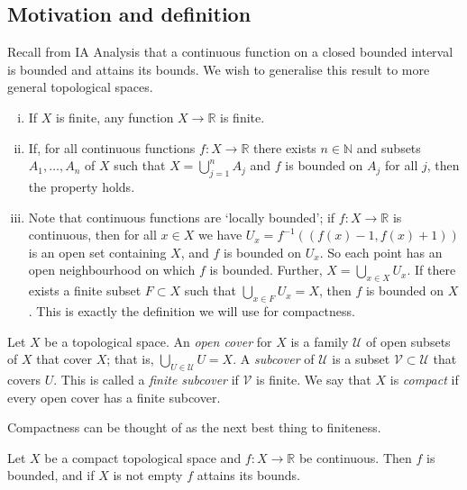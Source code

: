 \subsection{Motivation and definition}
Recall from IA Analysis that a continuous function on a closed bounded interval is bounded and attains its bounds.
We wish to generalise this result to more general topological spaces.
\begin{example}
	\begin{enumerate}[(i)]
		\item If \( X \) is finite, any function \( X \to \mathbb R \) is finite.
		\item If, for all continuous functions \( f \colon X \to \mathbb R \) there exists \( n \in \mathbb N \) and subsets \( A_1, \dots, A_n \) of \( X \) such that \( X = \bigcup_{j=1}^n A_j \) and \( f \) is bounded on \( A_j \) for all \( j \), then the property holds.
		\item Note that continuous functions are `locally bounded'; if \( f \colon X \to \mathbb R \) is continuous, then for all \( x \in X \) we have \( U_x = f^{-1}((f(x)-1, f(x)+1)) \) is an open set containing \( X \), and \( f \) is bounded on \( U_x \).
		      So each point has an open neighbourhood on which \( f \) is bounded.
		      Further, \( X = \bigcup_{x \in X} U_x \).
		      If there exists a finite subset \( F \subset X \) such that \( \bigcup_{x \in F} U_x = X \), then \( f \) is bounded on \( X \).
		      This is exactly the definition we will use for compactness.
	\end{enumerate}
\end{example}
\begin{definition}
	Let \( X \) be a topological space.
	An \textit{open cover} for \( X \) is a family \( \mathcal U \) of open subsets of \( X \) that cover \( X \); that is, \( \bigcup_{U \in \mathcal U} U = X \).
	A \textit{subcover} of \( \mathcal U \) is a subset \( \mathcal V \subset \mathcal U \) that covers \( U \).
	This is called a \textit{finite subcover} if \( \mathcal V \) is finite.
	We say that \( X \) is \textit{compact} if every open cover has a finite subcover.
\end{definition}
\begin{remark}
	Compactness can be thought of as the next best thing to finiteness.
\end{remark}
\begin{theorem}
	Let \( X \) be a compact topological space and \( f \colon X \to \mathbb R \) be continuous.
	Then \( f \) is bounded, and if \( X \) is not empty \( f \) attains its bounds.
\end{theorem}
